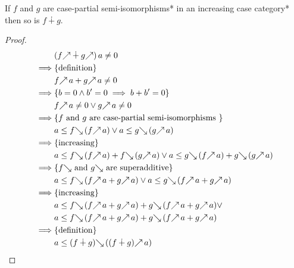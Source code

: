 \documentclass[runningheads,envcountsame]{llncs}
\begin{document}
\begin{lemma}
    If $f$ and $g$ are case-partial semi-isomorphisms* in an increasing case category* then so is $f \dotplus g$.
\end{lemma}
\begin{proof}
    \begin{align}
             & (\f{f} \dotplus \f{g})\,a \neq 0 \\
    \implies & \text{\{definition\}} \\
             & \f{f}\,a + \f{g}\,a \neq 0 \\
    \implies & \{ b = 0 \wedge b' = 0 \implies b + b' = 0 \} \\
             & \f{f}\,a \neq 0 \vee \f{g}\,a \neq 0 \\
    \implies & \text{\{$f$ and $g$ are case-partial semi-isomorphisms \}} \\
             & a \leq \b{f}\,(\f{f}\,a) \vee a \leq \b{g}\,(\f{g}\,a) \\
    \implies & \text{\{increasing\}} \\
             & a \leq \b{f}\,(\f{f}\,a) + \b{f}\,(\f{g}\,a) \vee a \leq \b{g}\,(\f{f}\,a) + \b{g}\,(\f{g}\,a) \\
    \implies & \text{\{$\b{f}$ and $\b{g}$ are superadditive\}} \\
             & a \leq \b{f}\,(\f{f}\,a + \f{g}\,a) \vee a \leq \b{g}\,(\f{f}\,a + \f{g}\,a) \\
    \implies & \text{\{increasing\}} \\
             & a \leq \b{f}\,(\f{f}\,a + \f{g}\,a) + \b{g}\,(\f{f}\,a + \f{g}\,a) \vee \\
             & a \leq \b{f}\,(\f{f}\,a + \f{g}\,a) + \b{g}\,(\f{f}\,a + \f{g}\,a) \\
    \implies & \text{\{definition\}} \\
             & a \leq \b{(f \dotplus g)}\,(\f{(f \dotplus g)}\,a)
    \end{align}
\end{proof}
\end{document}
